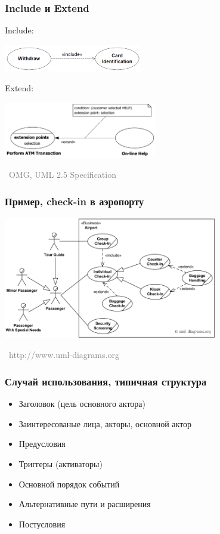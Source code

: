 \documentclass[xetex,mathserif,serif]{beamer}
\newcommand{\attribution}[1] {
	\vspace{-5mm}\begin{flushright}\begin{scriptsize}\textcolor{gray}{\textcopyright\, #1}\end{scriptsize}\end{flushright}
}
\begin{document}
	\begin{frame}
		\frametitle{Include и Extend}
		Include:
		\begin{center}
			\includegraphics[width=0.45\textwidth]{useCaseInclude.png}
		\end{center}
		\vspace{5mm}
		Extend:
		\begin{center}
			\includegraphics[width=0.5\textwidth]{useCaseExtend.png}
		\end{center}
		\attribution{OMG, UML 2.5 Specification}
	\end{frame}

	\begin{frame}
		\frametitle{Пример, check-in в аэропорту}
		\begin{center}
			\includegraphics[width=0.7\textwidth]{airportUseCase.png}
			\attribution{http://www.uml-diagrams.org}
		\end{center}
	\end{frame}

	\begin{frame}
		\frametitle{Случай использования, типичная структура}
		\begin{itemize}
			\item Заголовок (цель основного актора)
			\item Заинтересованые лица, акторы, основной актор
			\item Предусловия
			\item Триггеры (активаторы)
			\item Основной порядок событий
			\item Альтернативные пути и расширения
			\item Постусловия
		\end{itemize}
	\end{frame}
\end{document}

